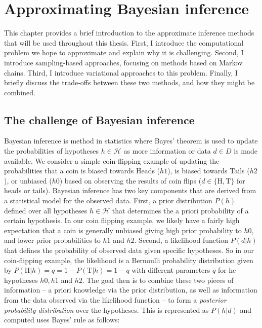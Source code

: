 
\chapter{Approximating Bayesian inference}
\label{chap:approx}

This chapter provides a brief introduction to the approximate inference methods that will be used throughout this thesis. First, I introduce the computational problem we hope to approximate and explain why it is challenging. Second, I introduce sampling-based approaches, focusing on methods based on Markov chains. Third, I introduce variational approaches to this problem. Finally, I briefly discuss the trade-offs between these two methods, and how they might be combined.

\section{The challenge of Bayesian inference}
Bayesian inference is method in statistics where Bayes' theorem is used to update the probabilities of hypotheses $h \in \mathcal{H}$ as more information or data $d \in D$ is made available. We consider a simple coin-flipping example of updating the probabilities that a coin is biased towards Heads ($h1$), is biased towards Tails ($h2$), or unbiased ($h0$) based on observing the results of coin flips ($d \in \{\text{H}, \text{T}\}$ for heads or tails). Bayesian inference has two key components that are derived from a statistical model for the observed data. First, a prior distribution $P(h)$ defined over all hypotheses $h \in \mathcal{H}$ that determines the a priori probability of a certain hypothesis. In our coin flipping example, we likely have a fairly high expectation that a coin is generally unbiased giving high prior probability to $h0$, and lower prior probabilities to $h1$ and $h2$. Second, a likelihood function $P(d | h)$ that defines the probability of observed data given specific hypotheses. So in our coin-flipping example, the likelihood is a Bernoulli probability distribution given by $P(\text{H} | h) = q = 1 - P(\text{T} | h) = 1- q$ with different parameters $q$ for he hypotheses $h0, h1$ and $h2$. The goal then is to combine these two pieces of information -- a priori knowledge via the prior distribution, as well as information from the data observed via the likelihood function -- to form a \textit{posterior probability distribution} over the hypotheses. This is represented as $P(h | d)$ and computed uses Bayes' rule as follows:

